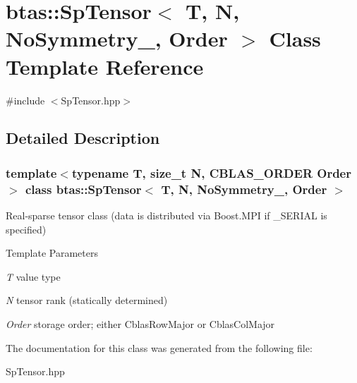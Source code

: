 \hypertarget{classbtas_1_1_sp_tensor_3_01_t_00_01_n_00_01_no_symmetry___00_01_order_01_4}{
\section{btas::SpTensor$<$ T, N, NoSymmetry\_\-, Order $>$ Class Template Reference}
\label{classbtas_1_1_sp_tensor_3_01_t_00_01_n_00_01_no_symmetry___00_01_order_01_4}
}


{\ttfamily \#include $<$SpTensor.hpp$>$}

\subsection{Detailed Description}
\subsubsection*{template$<$typename T, size\_\-t N, CBLAS\_\-ORDER Order$>$ class btas::SpTensor$<$ T, N, NoSymmetry\_\-, Order $>$}

Real-\/sparse tensor class (data is distributed via Boost.MPI if \_\-SERIAL is specified) 
\begin{DoxyTemplParams}{Template Parameters}
\item[{\em T}]value type \item[{\em N}]tensor rank (statically determined) \item[{\em Order}]storage order; either CblasRowMajor or CblasColMajor \end{DoxyTemplParams}


The documentation for this class was generated from the following file:\begin{DoxyCompactItemize}
\item 
SpTensor.hpp\end{DoxyCompactItemize}
